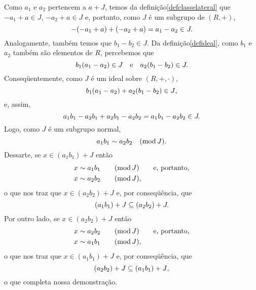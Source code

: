 \begin{dem}
  Como $a_1$ e $a_2$ pertencem a $a+J$,  temos da
  definição\xspace\ref{defclasselateral} que
  $-a_1+a\in J$, $-a_2+a\in J$ e, portanto,
  como $J$ é um subgrupo de $(R,+)$,
  \begin{equation*}
    -(-a_1+a)+(-a_2+a) = a_1 - a_2\in J\mathrm{.}
  \end{equation*}
  Analogamente, também temos que $b_1-b_2\in J$. Da
  definição\xspace\ref{defideal}, como $b_1$ e $a_2$ também são
  elementos de $R$, percebemos que
  \begin{equation*}
    b_1(a_1-a_2)\in J\quad\text{e}\quad a_2(b_1-b_2)\in J\mathrm{.}
  \end{equation*}
  Conseqüentemente, como $J$ é um ideal sobre $(R,+,\cdot)$,
  \begin{equation*}
    b_1(a_1-a_2) + a_2(b_1-b_2)\in J\mathrm{,}
  \end{equation*}
  e, assim,
  \begin{equation*}
    a_1b_1 - a_2b_1 + a_2b_1 - a_2b_2 = a_1b_1 - a_2b_2\in J\mathrm{.}
  \end{equation*}
  Logo, como $J$ é um subgrupo normal,
  \begin{equation*}
    \congmodright{a_1b_1}{a_2b_2}{J}\MMp
  \end{equation*}
  Dessarte, se $x\in (a_1b_1)+J$ então
  \begin{equation*}
    \begin{aligned}
      \congmodrighta{x}{a_1b_1}{J}\qquad\text{e, portanto,}\\
      \congmodrighta{x}{a_2b_2}{J}\MMv
    \end{aligned}
  \end{equation*}
  o que nos traz que $x\in (a_2b_2)+J$ e, por conseqüência, que
  \begin{equation*}
    (a_1b_1)+J\subseteq(a_2b_2)+J\mathrm{.}
  \end{equation*}
  Por outro lado, se $x\in (a_2b_2)+J$ então
  \begin{equation*}
    \begin{aligned}
      \congmodrighta{x}{a_2b_2}{J}\qquad\text{e, portanto,}\\
      \congmodrighta{x}{a_1b_1}{J}\MMv
    \end{aligned}
  \end{equation*}
  o que nos traz que $x\in (a_1b_1)+J$ e, por conseqüência, que
  \begin{equation*}
    (a_2b_2)+J\subseteq(a_1b_1)+J\mathrm{,}
  \end{equation*}
  o que completa nossa demonstração.
\end{dem}

